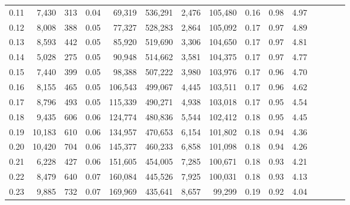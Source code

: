\begin{tabular}{rrrcrrrrrrrrrrr}
0.11 &   7,430 &    313 &                                       0.04 &   69,319 &  536,291 &    2,476 &  105,480 &  0.16 &  0.98 &                         4.97 \\
0.12 &   8,008 &    388 &                                       0.05 &   77,327 &  528,283 &    2,864 &  105,092 &  0.17 &  0.97 &                         4.89 \\
0.13 &   8,593 &    442 &                                       0.05 &   85,920 &  519,690 &    3,306 &  104,650 &  0.17 &  0.97 &                         4.81 \\
0.14 &   5,028 &    275 &                                       0.05 &   90,948 &  514,662 &    3,581 &  104,375 &  0.17 &  0.97 &                         4.77 \\
0.15 &   7,440 &    399 &                                       0.05 &   98,388 &  507,222 &    3,980 &  103,976 &  0.17 &  0.96 &                         4.70 \\
0.16 &   8,155 &    465 &                                       0.05 &  106,543 &  499,067 &    4,445 &  103,511 &  0.17 &  0.96 &                         4.62 \\
0.17 &   8,796 &    493 &                                       0.05 &  115,339 &  490,271 &    4,938 &  103,018 &  0.17 &  0.95 &                         4.54 \\
0.18 &   9,435 &    606 &                                       0.06 &  124,774 &  480,836 &    5,544 &  102,412 &  0.18 &  0.95 &                         4.45 \\
0.19 &  10,183 &    610 &                                       0.06 &  134,957 &  470,653 &    6,154 &  101,802 &  0.18 &  0.94 &                         4.36 \\
0.20 &  10,420 &    704 &                                       0.06 &  145,377 &  460,233 &    6,858 &  101,098 &  0.18 &  0.94 &                         4.26 \\
0.21 &   6,228 &    427 &                                       0.06 &  151,605 &  454,005 &    7,285 &  100,671 &  0.18 &  0.93 &                         4.21 \\
0.22 &   8,479 &    640 &                                       0.07 &  160,084 &  445,526 &    7,925 &  100,031 &  0.18 &  0.93 &                         4.13 \\
0.23 &   9,885 &    732 &                                       0.07 &  169,969 &  435,641 &    8,657 &   99,299 &  0.19 &  0.92 &                         4.04 \\

\end{tabular}
